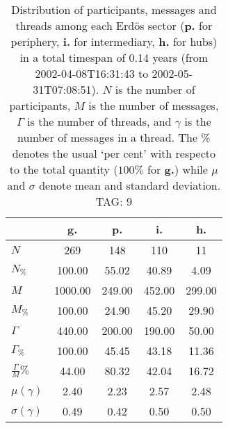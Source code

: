 \begin{table}[h!]
\begin{center}
\begin{tabular}{| l || c | c | c | c |}\hline
 & {\bf g.} & {\bf p.} & {\bf i.} & {\bf h.} \\\hline\hline
$N$ & 269  & 148  & 110  & 11 \\
$N_{\%}$ & 100.00  & 55.02  & 40.89  & 4.09 \\\hline
$M$ & 1000.00  & 249.00  & 452.00  & 299.00 \\
$M_{\%}$ & 100.00  & 24.90  & 45.20  & 29.90 \\\hline
$\Gamma$ & 440.00  & 200.00  & 190.00  & 50.00 \\
$\Gamma_{\%}$ & 100.00  & 45.45  & 43.18  & 11.36 \\\hline
$\frac{\Gamma}{M}\%$ & 44.00  & 80.32  & 42.04  & 16.72 \\
$\mu(\gamma)$ & 2.40  & 2.23  & 2.57  & 2.48 \\
$\sigma(\gamma)$ & 0.49  & 0.42  & 0.50  & 0.50 \\\hline
\end{tabular}
\caption{Distribution of participants, messages and threads among each Erd\"os sector ({\bf p.} for periphery, {\bf i.} for intermediary, 
    {\bf h.} for hubs) in a total timespan of 0.14 years (from 2002-04-08T16:31:43 to 2002-05-31T07:08:51). $N$ is the number of participants, $M$ is the number of messages, $\Gamma$ is the number of threads, and $\gamma$ is the number of messages in a thread.
    The \% denotes the usual `per cent' with respecto to the total quantity ($100\%$ for {\bf g.})
    while $\mu$ and $\sigma$ denote mean and standard deviation. TAG: 9}
\end{center}
\end{table}